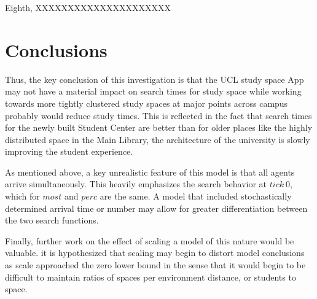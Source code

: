 \documentclass[11pt]{article} %
\begin{document}
Eighth, XXXXXXXXXXXXXXXXXXXXX



\section{Conclusions}

Thus, the key conclusion of this investigation is that the UCL study space App may not have a material impact on search times for study space while working towards more tightly clustered study spaces at major points across campus probably would reduce study times. This is reflected in the fact that search times for the newly built Student Center are better than for older places like the highly distributed space in the Main Library, the architecture of the university is slowly improving the student experience. 


As mentioned above, a key unrealistic feature of this model is that all agents arrive simultaneously. This heavily emphasizes the search behavior at $tick \: 0$, which for $most$ and $perc$ are the same. A model that included stochastically determined arrival time or number may allow for greater differentiation between the two search functions. 

Finally, further work on the effect of scaling a model of this nature would be valuable. it is hypothesized that scaling may begin to distort model conclusions as scale approached the zero lower bound in the sense that it would begin to be difficult to maintain ratios of spaces per environment distance, or students to space.  

\nocite{*}

\medskip


\printbibliography
\end{document}
